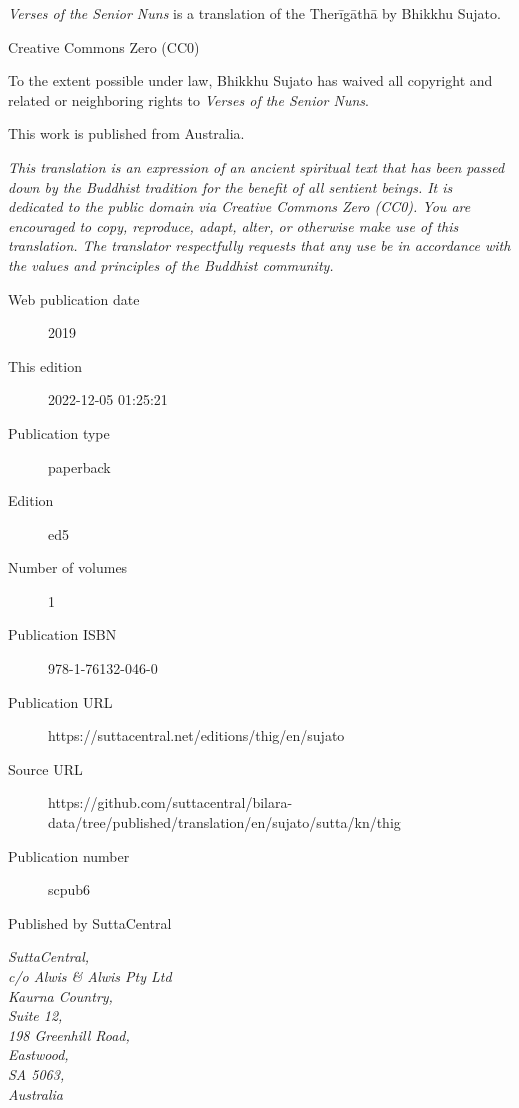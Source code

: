 \documentclass[12pt,openany]{book}%
\begin{document}
\begin{footnotesize}

\textit{Verses of the Senior Nuns} is a translation of the Therīgāthā by Bhikkhu Sujato.

\medskip

Creative Commons Zero (CC0)

To the extent possible under law, Bhikkhu Sujato has waived all copyright and related or neighboring rights to \textit{Verses of the Senior Nuns}.

\medskip

This work is published from Australia.

\begin{center}
\textit{This translation is an expression of an ancient spiritual text that has been passed down by the Buddhist tradition for the benefit of all sentient beings. It is dedicated to the public domain via Creative Commons Zero (CC0). You are encouraged to copy, reproduce, adapt, alter, or otherwise make use of this translation. The translator respectfully requests that any use be in accordance with the values and principles of the Buddhist community.}
\end{center}

\medskip

\begin{description}
    \item[Web publication date] 2019
    \item[This edition] 2022-12-05 01:25:21
    \item[Publication type] paperback
    \item[Edition] ed5
    \item[Number of volumes] 1
    \item[Publication ISBN] 978-1-76132-046-0
    \item[Publication URL] https://suttacentral.net/editions/thig/en/sujato
    \item[Source URL] https://github.com/suttacentral/bilara-data/tree/published/translation/en/sujato/sutta/kn/thig
    \item[Publication number] scpub6
\end{description}

\medskip

Published by SuttaCentral

\medskip

\textit{SuttaCentral,\\
c/o Alwis \& Alwis Pty Ltd\\
Kaurna Country,\\
Suite 12,\\
198 Greenhill Road,\\
Eastwood,\\
SA 5063,\\
Australia}

\end{footnotesize}
\end{document}
